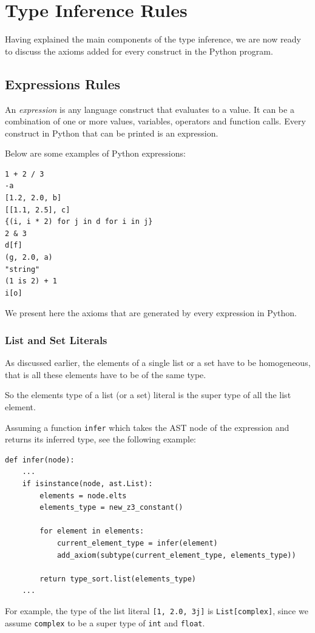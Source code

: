 \section{Type Inference Rules}
Having explained the main components of the type inference, we are now ready to discuss the axioms added for every construct in the Python program.
\subsection{Expressions Rules}
An \textit{expression} is any language construct that evaluates to a value. It can be a combination of one or more values, variables, operators and function calls. Every construct in Python that can be printed is an expression.

Below are some examples of Python expressions:
\begin{lstlisting}
1 + 2 / 3
-a
[1.2, 2.0, b]
[[1.1, 2.5], c]
{(i, i * 2) for j in d for i in j}
2 & 3
d[f]
(g, 2.0, a)
"string"
(1 is 2) + 1
i[o]
\end{lstlisting}

We present here the axioms that are generated by every expression in Python.

\subsubsection{List and Set Literals}
As discussed earlier, the elements of a single list or a set have to be homogeneous, that is all these elements have to be of the same type.

So the elements type of a list (or a set) literal is the super type of all the list element.

Assuming a function \lstinline|infer| which takes the AST node of the expression and returns its inferred type, see the following example:

\begin{lstlisting}
def infer(node):
	...
	if isinstance(node, ast.List):
		elements = node.elts
		elements_type = new_z3_constant()
		
		for element in elements:
			current_element_type = infer(element)
			add_axiom(subtype(current_element_type, elements_type))
			
		return type_sort.list(elements_type)
	...
\end{lstlisting}

For example, the type of the list literal \lstinline|[1, 2.0, 3j]| is \lstinline|List[complex]|, since we assume \lstinline|complex| to be a super type of \lstinline|int| and \lstinline|float|.\\

